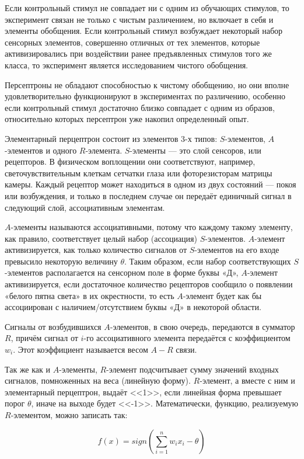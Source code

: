 Если контрольный стимул не совпадает ни с одним из обучающих стимулов, то эксперимент связан не только с чистым различением, но включает в себя и элементы обобщения.
Если контрольный стимул возбуждает некоторый набор сенсорных элементов, совершенно отличных от тех элементов, которые активизировались при воздействии ранее предъявленных стимулов того же класса, то эксперимент является исследованием чистого обобщения.

Персептроны не обладают способностью к чистому обобщению, но они вполне удовлетворительно функционируют в экспериментах по различению, особенно если контрольный стимул достаточно близко совпадает с одним из образов, относительно которых персептрон уже накопил определенный опыт.

Элементарный перцептрон состоит из элементов 3-х типов: $S$-элементов, $A$-элементов и одного $R$-элемента. $S$-элементы — это слой сенсоров, или рецепторов. В физическом воплощении они соответствуют, например, светочувствительным клеткам сетчатки глаза или фоторезисторам матрицы камеры. Каждый рецептор может находиться в одном из двух состояний — покоя или возбуждения, и только в последнем случае он передаёт единичный сигнал в следующий слой, ассоциативным элементам.

$A$-элементы называются ассоциативными, потому что каждому такому элементу, как правило, соответствует целый набор (ассоциация) $S$-элементов. $A$-элемент активизируется, как только количество сигналов от $S$-элементов на его входе превысило некоторую величину $\theta$. Таким образом, если набор соответствующих $S$-элементов располагается на сенсорном поле в форме буквы «Д», $A$-элемент активизируется, если достаточное количество рецепторов сообщило о появлении «белого пятна света» в их окрестности, то есть $A$-элемент будет как бы ассоциирован с наличием/отсутствием буквы «Д» в некоторой области.

Сигналы от возбудившихся $A$-элементов, в свою очередь, передаются в сумматор $R$, причём сигнал от $i$-го ассоциативного элемента передаётся с коэффициентом $w_{i}$. Этот коэффициент называется весом $A-R$ связи.

Так же как и $A$-элементы, $R$-элемент подсчитывает сумму значений входных сигналов, помноженных на веса (линейную форму). $R$-элемент, а вместе с ним и элементарный перцептрон, выдаёт <<1>>, если линейная форма превышает порог $\theta$, иначе на выходе будет <<-1>>. Математически, функцию, реализуемую $R$-элементом, можно записать так:

    $$f(x) = sign(\sum_{i=1}^{n} w_i x_i - \theta)$$

